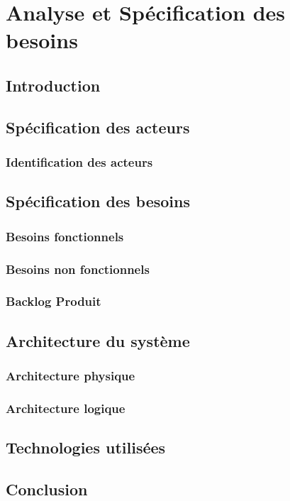 \chapter{Analyse et Spécification des besoins}

\section*{Introduction}

\section{Spécification des acteurs}

\subsection{Identification des acteurs}

\section{Spécification des besoins}

\subsection{Besoins fonctionnels}

\subsection{Besoins non fonctionnels}

\subsection{Backlog Produit}

\section{Architecture du système}

\subsection{Architecture physique}

\subsection{Architecture logique}

\section{Technologies utilisées}

\section*{Conclusion}
